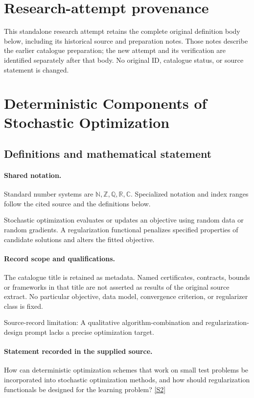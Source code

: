 \documentclass[11pt]{article}
\begin{document}
\section*{Research-attempt provenance}
This standalone research attempt retains the complete original definition body below,
including its historical source and preparation notes. Those notes describe the
earlier catalogue preparation; the new attempt and its verification are identified
separately after that body. No original ID, catalogue status, or source statement is changed.

\section{Deterministic Components of Stochastic Optimization}\label{statement}

\subsection{Definitions and mathematical statement}

\paragraph{Shared notation.}Standard number systems are $\mathbb N,\mathbb Z,\mathbb Q,\mathbb R,\mathbb C$. Specialized notation and index ranges follow the cited source and the definitions below.


Stochastic optimization evaluates or updates an objective using random data or random gradients. A regularization functional penalizes specified properties of candidate solutions and alters the fitted objective.
\paragraph{Record scope and qualifications.}
The catalogue title is retained as metadata. Named certificates, contracts, bounds or frameworks in that title are not asserted as results of the original source extract.
No particular objective, data model, convergence criterion, or regularizer class is fixed.

Source-record limitation: A qualitative algorithm-combination and regularization-design prompt lacks a precise optimization target.
\paragraph{Statement recorded in the supplied source.}
How can deterministic optimization schemes that work on small test problems be incorporated into stochastic optimization methods, and how should regularization functionals be designed for the learning problem? \href{https://doi.org/10.4171/owr/2018/11}{[S2]}
\end{document}
